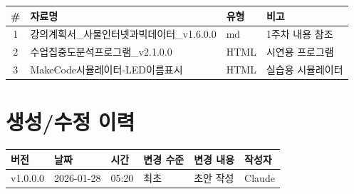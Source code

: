 \documentclass[11pt, a4paper]{article}
\begin{document}
\begin{table}[H]
\centering
\begin{tabularx}{\textwidth}{c l l X}
\toprule
\textbf{\#} & \textbf{자료명} & \textbf{유형} & \textbf{비고} \\
\midrule
1 & 강의계획서\_사물인터넷과빅데이터\_v1.6.0.0 & md & 1주차 내용 참조 \\
2 & 수업집중도분석프로그램\_v2.1.0.0 & HTML & 시연용 프로그램 \\
3 & MakeCode시뮬레이터-LED이름표시 & HTML & 실습용 시뮬레이터 \\
\bottomrule
\end{tabularx}
\end{table}

\section*{생성/수정 이력}

\begin{table}[H]
\centering
\begin{tabularx}{\textwidth}{l l l l X l}
\toprule
\textbf{버전} & \textbf{날짜} & \textbf{시간} & \textbf{변경 수준} & \textbf{변경 내용} & \textbf{작성자} \\
\midrule
v1.0.0.0 & 2026-01-28 & 05:20 & 최초 & 초안 작성 & Claude \\
\bottomrule
\end{tabularx}
\end{table}
\end{document}
